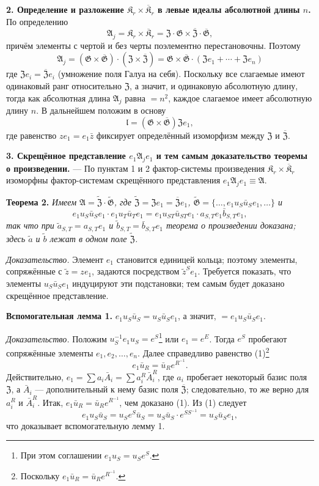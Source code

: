 \documentclass[11pt]{article}
\newcommand{\srcfn}[2]{\footnote{#2}}
\begin{document}
\noindent\textbf{2. Определение и разложение \(\mathfrak K_r\times\overline{\mathfrak K}_r\) в левые идеалы абсолютной длины \(n\).} По определению
\[
\mathfrak A_j=\mathfrak K_r\times\overline{\mathfrak K}_r
=\mathfrak Z\cdot\mathfrak G\times\overline{\mathfrak Z}\cdot\overline{\mathfrak G},
\]
причём элементы с чертой и без черты поэлементно перестановочны. Поэтому
\[
\mathfrak A_j
=(\mathfrak G\times\overline{\mathfrak G})\cdot(\mathfrak Z\times\overline{\mathfrak Z})
=\mathfrak G\times\overline{\mathfrak G}\cdot(\mathfrak Ze_1+\cdots+\mathfrak Ze_n)
\]
где \(\mathfrak Ze_i=\overline{\mathfrak Z}e_i\) (умножение поля Галуа на себя). Поскольку все слагаемые имеют одинаковый ранг относительно \(\mathfrak Z\), а значит, и одинаковую абсолютную длину, тогда как абсолютная длина \(\mathfrak A_j\) равна \(=n^2\), каждое слагаемое имеет абсолютную длину \(n\). В дальнейшем положим в основу
\[
\mathfrak l=(\mathfrak G\times\overline{\mathfrak G})\mathfrak Ze_1,
\]
где равенство \(ze_1=e_1\bar z\) фиксирует определённый изоморфизм между \(\mathfrak Z\) и \(\overline{\mathfrak Z}\).

\noindent\textbf{3. Скрещённое представление \(e_1\mathfrak A_je_1\) и тем самым доказательство теоремы о произведении.} --- По пунктам 1 и 2 фактор-системы произведения \(\mathfrak K_r\times\overline{\mathfrak K}_r\) изоморфны фактор-системам скрещённого представления \(e_1\mathfrak A_je_1\equiv\mathfrak A\).

\noindent\textbf{Теорема 2.} \emph{Имеем \(\mathfrak A=\widetilde{\mathfrak Z}\cdot\widetilde{\mathfrak G}\), где \(\widetilde{\mathfrak Z}=\mathfrak Ze_1=\overline{\mathfrak Z}e_1\), \(\widetilde{\mathfrak G}=\{\ldots,e_1u_S\bar u_Se_1,\ldots\}\) и
\[
e_1u_S\bar u_Se_1\cdot e_1u_T\bar u_Te_1
=e_1u_{ST}\bar u_{ST}e_1\cdot a_{S,T}e_1\bar b_{S,T}e_1,
\]
так что при \(\tilde a_{S,T}=a_{S,T}e_1\) и \(\tilde b_{S,T}=\bar b_{S,T}e_1\) теорема о произведении доказана; здесь \(\tilde a\) и \(\tilde b\) лежат в одном поле \(\widetilde{\mathfrak Z}\).}

\noindent\emph{Доказательство.} Элемент \(e_1\) становится единицей кольца; поэтому элементы, сопряжённые с \(\tilde z=ze_1\), задаются посредством \(\tilde z^Se_1\). Требуется показать, что элементы \(u_S\bar u_Se_1\) индуцируют эти подстановки; тем самым будет доказано скрещённое представление.

\noindent\textbf{Вспомогательная лемма 1.} \(e_1u_S\bar u_S=u_S\bar u_Se_1\), а значит, \(=e_1u_S\bar u_Se_1\).

\noindent\emph{Доказательство.} Положим \(u_S^{-1}e_1u_S=e^S\)\srcfn{1}{При этом соглашении \(e_1u_S=u_Se^S\).} или \(e_1=e^E\). Тогда \(e^S\) пробегают сопряжённые элементы \(e_1,e_2,\ldots,e_n\). Далее справедливо равенство (1)\srcfn{2}{Поскольку \(e_1\bar u_R=\bar u_Re^{R^{-1}}\).}
\[
e_1\bar u_R=\bar u_Re^{R^{-1}}.
\]
Действительно, \(e_1=\sum a_i\bar A_i=\sum a_i^R\bar A_i^R\), где \(a_i\) пробегает некоторый базис поля \(\mathfrak Z\), а \(\bar A_i\) --- дополнительный к нему базис поля \(\overline{\mathfrak Z}\); следовательно, то же верно для \(a_i^R\) и \(\bar A_i^R\). Итак, \(e_1\bar u_R=\bar u_Re^{R^{-1}}\), чем доказано (1). Из (1) следует
\[
e_1u_S\bar u_S=u_Se^S\bar u_S=u_S\bar u_S\cdot e^{SS^{-1}}=u_S\bar u_Se_1,
\]
что доказывает вспомогательную лемму 1.
\end{document}
